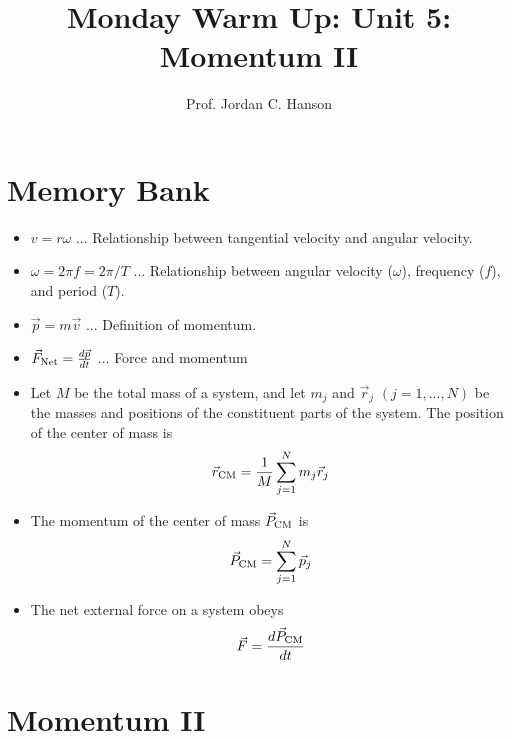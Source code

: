 \documentclass{article}
\begin{document}
\twocolumn

\title{Monday Warm Up: Unit 5: Momentum II}
\author{Prof. Jordan C. Hanson}

\maketitle

\section{Memory Bank}

\begin{itemize}
\item $v = r \omega$ ... Relationship between tangential velocity and angular velocity.
\item $\omega = 2\pi f = 2\pi/T$ ... Relationship between angular velocity ($\omega$), frequency ($f$), and period ($T$).
\item $\vec{p} = m\vec{v}$ ... Definition of momentum.
\item $\vec{F}_{\rm Net} = \frac{d\vec{p}}{dt}$ ... Force and momentum
\item Let $M$ be the total mass of a system, and let $m_j$ and $\vec{r}_j$ $(j = 1,...,N)$ be the masses and positions of the constituent parts of the system.  The position of the center of mass is
\begin{equation}
\vec{r}_{\rm CM} = \frac{1}{M}\sum_{j=1}^{N}m_j \vec{r}_j
\end{equation}
\item The momentum of the center of mass $\vec{P}_{\rm CM}$ is
\begin{equation}
\vec{P}_{\rm CM} = \sum_{j=1}^N \vec{p}_j
\end{equation}
\item The net external force on a system obeys
\begin{equation}
\vec{F} = \frac{d\vec{P}_{\rm CM}}{dt}
\end{equation}
\end{itemize}

\section{Momentum II}
\end{document}
